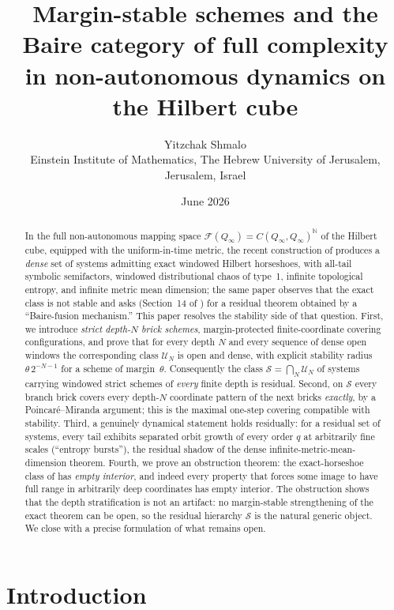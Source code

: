 \documentclass[11pt]{article}
\title{Margin-stable schemes and the Baire category of full complexity\\
in non-autonomous dynamics on the Hilbert cube}
\author{Yitzchak Shmalo\\
\small Einstein Institute of Mathematics, The Hebrew University of Jerusalem, Jerusalem, Israel\\
\small }
\date{June 2026}
\newcommand{\Q}{Q_\infty}
\newcommand{\F}{\mathcal{F}}
\begin{document}
\maketitle

\begin{abstract}
In the full non-autonomous mapping space $\F(\Q)=C(\Q,\Q)^{\mathbb N}$ of the Hilbert cube,
equipped with the uniform-in-time metric, the recent construction of
\cite{Shmalo2026} produces a \emph{dense} set of systems admitting exact windowed
Hilbert horseshoes, with all-tail symbolic semifactors, windowed distributional chaos of
type~1, infinite topological entropy, and infinite metric mean dimension; the same paper
observes that the exact class is not stable and asks (Section~14 of \cite{Shmalo2026})
for a residual theorem obtained by a ``Baire-fusion mechanism.''
This paper resolves the stability side of that question.  First, we introduce
\emph{strict depth-$N$ brick schemes}, margin-protected finite-coordinate covering
configurations, and prove that for every depth $N$ and every sequence of dense open
windows the corresponding class $\mathcal U_N$ is open and dense, with explicit
stability radius $\theta\,2^{-N-1}$ for a scheme of margin~$\theta$.  Consequently the
class $\mathcal S=\bigcap_N \mathcal U_N$ of systems carrying windowed strict schemes of
\emph{every} finite depth is residual.  Second, on $\mathcal S$ every branch brick covers
every depth-$N$ coordinate pattern of the next bricks \emph{exactly}, by a
Poincar\'e--Miranda argument; this is the maximal one-step covering compatible with
stability.  Third, a genuinely dynamical statement holds residually: for a residual
set of systems, every tail exhibits separated orbit growth of every order $q$ at
arbitrarily fine scales (``entropy bursts''), the residual shadow of the dense
infinite-metric-mean-dimension theorem.  Fourth, we prove an obstruction theorem: the
exact-horseshoe class of
\cite{Shmalo2026} has \emph{empty interior}, and indeed every property that forces some
image to have full range in arbitrarily deep coordinates has empty interior.  The
obstruction shows that the depth stratification is not an artifact: no margin-stable
strengthening of the exact theorem can be open, so the residual hierarchy
$\mathcal S$ is the natural generic object.  We close with a precise formulation of
what remains open.
\end{abstract}

\section{Introduction}\label{sec:intro}
\end{document}
